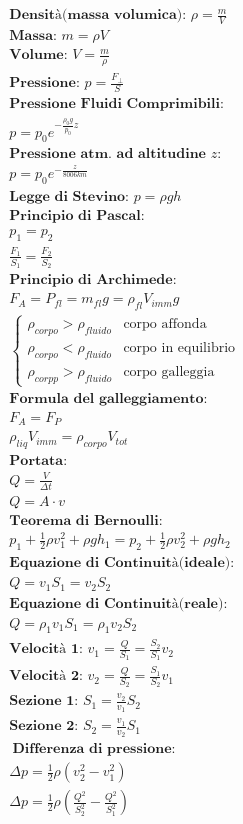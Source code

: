 \begin{gather*}
    \textbf{Densità(massa volumica): } \rho = \frac{m}{V} \\
    \textbf{Massa: } m = \rho V \\
    \textbf{Volume: } V = \frac{m}{\rho} \\
    \textbf{Pressione: } p = \frac{F_\perp}{S} \\
    \textbf{Pressione Fluidi Comprimibili: } \\ p = p_0e^{-\frac{\rho_0 g}{p_0}z} \\
    \textbf{Pressione atm. ad altitudine $z$: } \\
    p = p_0e^{-\frac{z}{8006km}} \\
    \textbf{Legge di Stevino: } p = \rho g h \\
    \textbf{Principio di Pascal: } \\ p_1 = p_2 \\ \frac{F_1}{S_1} = \frac{F_2}{S_2} \\
    \textbf{Principio di Archimede: } \\ F_A = P_{fl} = m_{fl} g = \rho_{fl} V_{imm} g \\ \begin{cases}
        \rho_{corpo} > \rho_{fluido} & \text{corpo affonda} \\
        \rho_{corpo} < \rho_{fluido} & \text{corpo in equilibrio} \\
        \rho_{corpp} > \rho_{fluido} & \text{corpo galleggia}
    \end{cases} \\
    \textbf{Formula del galleggiamento: } \\ F_A = F_P \\ \rho_{liq} V_{imm} = \rho_{corpo} V_{tot} \\
    \textbf{Portata: } \\ Q = \frac{V}{\Delta t} \\ Q = A \cdot v \\
    \textbf{Teorema di Bernoulli: } \\ p_1 + \frac{1}{2} \rho v_1^2 + \rho g h_1 = p_2 + \frac{1}{2} \rho v_2^2 + \rho g h_2 \\
    \textbf{Equazione di Continuità(ideale): } \\  Q = v_1 S_1 = v_2 S_2 \\
    \textbf{Equazione di Continuità(reale): } \\ Q = \rho_1 v_1 S_1 = \rho_1 v_2 S_2 \\
    \textbf{Velocità 1: } v_1 = \frac{Q}{S_1} = \frac{S_2}{S_1} v_2 \\
    \textbf{Velocità 2: } v_2 = \frac{Q}{S_2} = \frac{S_1}{S_2} v_1 \\
    \textbf{Sezione 1: } S_1 = \frac{v_2}{v_1} S_2 \\
    \textbf{Sezione 2: } S_2 = \frac{v_1}{v_2} S_1 \\\
    \textbf{Differenza di pressione: } \\
    \Delta p = \frac{1}{2} \rho (v_2^2 - v_1^2) \\ 
    \Delta p = \frac{1}{2} \rho (\frac{Q^2}{S_2^2} - \frac{Q^2}{S_1^2})
\end{gather*}